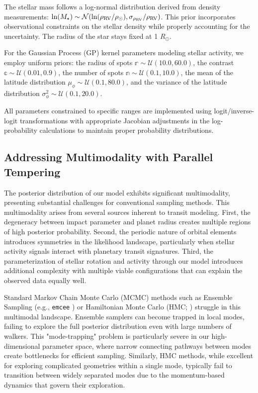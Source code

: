 \documentclass[twocolumn]{aastex631}
\begin{document}
The stellar mass follows a log-normal distribution derived from density measurements: 
$\ln(M_{\star}) \sim \mathcal{N}(\ln(\rho_{\rm RV} / \rho_{\odot}), \sigma_{\rho_{\rm RV}} / \rho_{\rm RV})$. 
This prior incorporates observational constraints on the stellar density while properly accounting for the uncertainty.
The radius of the star stays fixed at 1 $R_\odot$.

For the Gaussian Process (GP) kernel parameters modeling stellar activity, we employ uniform priors: the radius of spots 
$\mathbb{r} \sim \mathcal{U}(10.0, 60.0)$, the contrast $\mathbb{c} \sim \mathcal{U}(0.01, 0.9)$, 
the number of spots $\mathbb{n} \sim \mathcal{U}(0.1, 10.0)$, the mean of the latitude distribution $\mu_\phi \sim \mathcal{U}(0.1, 80.0)$, 
and the variance of the latitude distribution $\sigma^2_\phi \sim \mathcal{U}(0.1, 20.0)$.

All parameters constrained to specific ranges are implemented using logit/inverse-logit transformations with appropriate 
Jacobian adjustments in the log-probability calculations to maintain proper probability distributions.

\subsection{Addressing Multimodality with Parallel Tempering}

The posterior distribution of our model exhibits significant multimodality, presenting substantial challenges for 
conventional sampling methods. This multimodality arises from several sources inherent to transit modeling. 
First, the degeneracy between impact parameter and planet radius creates multiple regions of high posterior probability. 
Second, the periodic nature of orbital elements introduces symmetries in the likelihood landscape, particularly when stellar 
activity signals interact with planetary transit signatures. Third, the parameterization of stellar rotation and activity through 
our model introduces additional complexity with multiple viable configurations that can explain the observed data equally well.

Standard Markov Chain Monte Carlo (MCMC) methods such as Ensemble Sampling (e.g., \texttt{emcee} \cite{emcee}) or Hamiltonian Monte Carlo (HMC; \cite{Hoffman2011}) struggle 
in this multimodal landscape. Ensemble samplers can become trapped in local modes, failing to explore the full posterior 
distribution even with large numbers of walkers. This "mode-trapping" problem is particularly severe in our high-dimensional 
parameter space, where narrow connecting pathways between modes create bottlenecks for efficient sampling. Similarly, 
HMC methods, while excellent for exploring complicated geometries within a single mode, typically fail to transition between 
widely separated modes due to the momentum-based dynamics that govern their exploration.
\end{document}
